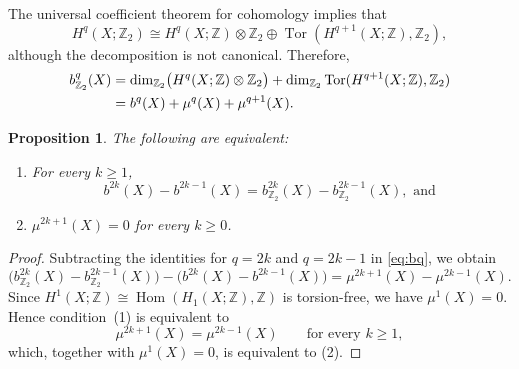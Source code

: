 \documentclass{amsart}
\newcommand{\Z}{\mathbb{Z}}
\newcommand{\Tor}{\operatorname{Tor}}
\newcommand{\Hom}{\operatorname{Hom}}
\theoremstyle{plain}
\newtheorem{proposition}[theorem]{Proposition}
\numberwithin{equation}{section}
\theoremstyle{definition}
\theoremstyle{remark}
\begin{document}
The universal coefficient theorem for cohomology implies that
$$
H^q(X; \Z_2) \cong H^q(X; \Z) \otimes \Z_2 \oplus \Tor(H^{q+1}(X;\Z), \Z_2),
$$
although the decomposition is not canonical. Therefore,
\begin{align}
    b^q_{\Z_2}(X) &= \dim_{\Z_2}\bigl(H^q(X;\Z)\otimes \Z_2\bigr) + \dim_{\Z_2}\Tor(H^{q+1}(X;\Z),\Z_2) \notag\\
    &= b^q(X)+\mu^q(X)+\mu^{q+1}(X). \label{eq:bq}
\end{align}

\begin{proposition}\label{prop:betti_difference_and_odd_2_torsion}
    The following are equivalent:
    \begin{enumerate}
        \item For every $k\geq 1$,
        $$  
            b^{2k}(X)-b^{2k-1}(X) = b^{2k}_{\Z_2}(X)-b^{2k-1}_{\Z_2}(X), \text{ and }
        $$
        \item $\mu^{2k+1}(X)=0$ for every $k\ge 0$.
    \end{enumerate}
\end{proposition}

\begin{proof}
    Subtracting the identities for $q=2k$ and $q=2k-1$ in \eqref{eq:bq}, we obtain
    $$
        \bigl(b^{2k}_{\Z_2}(X)-b^{2k-1}_{\Z_2}(X)\bigr) - \bigl(b^{2k}(X)-b^{2k-1}(X)\bigr) = \mu^{2k+1}(X)-\mu^{2k-1}(X).
    $$
    Since $H^1(X;\Z)\cong \Hom(H_1(X;\Z),\Z)$ is torsion-free, we have $\mu^1(X)=0$. 
    Hence condition~\textup{(1)} is equivalent to
    $$
        \mu^{2k+1}(X)=\mu^{2k-1}(X) \qquad\text{for every }k\ge 1,
    $$
    which, together with $\mu^1(X)=0$, is equivalent to \textup{(2)}.
\end{proof}
\end{document}
